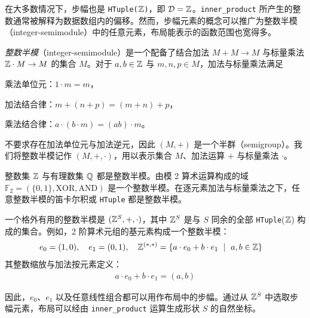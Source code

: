 在大多数情况下，步幅也是 \texttt{HTuple($\mathbb{Z}$)}，即 $\mathcal{D} = \mathbb{Z}$。\texttt{inner\_product} 所产生的整数通常被解释为数据数组内的偏移。然而，步幅元素的概念可以推广为整数半模（integer-semimodule）中的任意元素，布局能表示的函数范围也宽得多。


\begin{definition}
\emph{整数半模}（integer-semimodule）是一个配备了结合加法 $M + M \to M$ 与标量乘法 $\mathbb{Z} \cdot M \to M$ 的集合 $M$。对于 $a,b \in \mathbb{Z}$ 与 $m,n,p \in M$，加法与标量乘法满足
\begin{compactitem}
\item 乘法单位元：$1 \cdot m = m$，
\item 加法结合律：$m + (n + p) = (m + n) + p$，
\item 乘法结合律：$a \cdot (b \cdot m) = (ab) \cdot m$。
\end{compactitem}
不要求存在加法单位元与加法逆元，因此 $(M,+)$ 是一个半群（semigroup）。我们将整数半模记作 $(M,+,\cdot)$，用以表示集合 $M$、加法运算 $+$ 与标量乘法 $\cdot$。
\end{definition}

整数集 $\mathbb{Z}$ 与有理数集 $\mathbb{Q}$ 都是整数半模。由模 2 算术运算构成的域 $\mathbb{F}_2 = (\{0,1\},\text{XOR},\text{AND})$ 是一个整数半模。在逐元素加法与标量乘法之下，任意整数半模的笛卡尔积或 {\tt HTuple} 都是整数半模。

一个格外有用的整数半模是 $(\mathbb{Z}^S,+,\cdot)$，其中 $\mathbb{Z}^S$ 是与 $S$ 同余的全部 {\tt HTuple}($\mathbb{Z}$) 构成的集合。例如，2 阶算术元组的基元素构成一个整数半模：
\begin{align*}
e_0 = (1,0), \quad e_1 = (0,1), \quad \mathbb{Z}^{(\ast,\ast)} &= \{a \cdot e_0 + b \cdot e_1 \ \mid \ a, b \in \mathbb{Z}\}
\end{align*}
其整数缩放与加法按元素定义：
{\small
\begin{align*}
a \cdot e_0 + b \cdot e_1 = (a, b)
\end{align*}}

因此，$e_0$、$e_1$ 以及任意线性组合都可以用作布局中的步幅。通过从 $\mathbb{Z}^S$ 中选取步幅元素，布局可以经由 \texttt{inner\allowbreak\_product} 运算生成形状 $S$ 的自然坐标。
